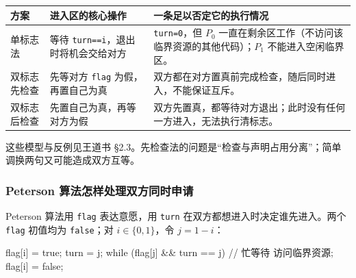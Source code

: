 \begin{wideblock}

\par\medskip\noindent\begin{minipage}{\linewidth}\fontsize{9.3}{12}\selectfont\begin{tabularx}{\linewidth}{@{}YYY@{}}
\toprule\noalign{}
\begin{minipage}[b]{\linewidth}\raggedright
方案
\end{minipage} & \begin{minipage}[b]{\linewidth}\raggedright
进入区的核心操作
\end{minipage} & \begin{minipage}[b]{\linewidth}\raggedright
一条足以否定它的执行情况
\end{minipage} \\
\midrule\noalign{}


单标志法 & 等待 \texttt{turn=\allowbreak{}=\allowbreak{}i}，退出时将机会交给对方 & \texttt{turn=\allowbreak{}0}，但 \(P_0\) 一直在剩余区工作（不访问该临界资源的其他代码）；\(P_1\) 不能进入空闲临界区。 \\
双标志先检查 & 先等对方 \texttt{flag} 为假，再置自己为真 & 双方都在对方置真前完成检查，随后同时进入，不能保证互斥。 \\
双标志后检查 & 先置自己为真，再等对方为假 & 双方先置真，都等待对方退出；此时没有任何一方进入，无法执行清标志。 \\
\bottomrule\end{tabularx}
\end{minipage}\par\medskip

\end{wideblock}

这些模型与反例见王道书 §2.3。先检查法的问题是``检查与声明占用分离''；简单调换两句又可能造成双方互等。

\subsubsection{Peterson 算法怎样处理双方同时申请}\label{OS02-auto-10}

Peterson 算法用 \texttt{flag} 表达意愿，用 \texttt{turn} 在双方都想进入时决定谁先进入。两个 \texttt{flag} 初值均为 \texttt{false}；对 \(i\in\{0,1\}\)，令 \(j=1-i\)：

\begin{codeblock}[language={}]
flag[i] = true;
turn = j;
while (flag[j] && turn == j) { }  // 忙等待
访问临界资源;
flag[i] = false;
\end{codeblock}

